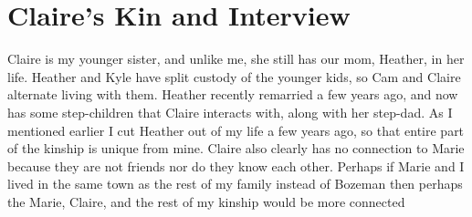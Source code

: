 \documentclass[12pt,a4paper]{article}
\begin{document}
\section*{Claire's Kin and Interview}
Claire is my younger sister, and unlike me, she still has our mom, Heather, in her life. Heather and Kyle have split custody of the younger kids, so Cam and Claire alternate living with them. Heather recently remarried a few years ago, and now has some step-children that Claire interacts with, along with her step-dad. As I mentioned earlier I cut Heather out of my life a few years ago, so that entire part of the kinship is unique from mine. Claire also clearly has no connection to Marie because they are not friends nor do they know each other. Perhaps if Marie and I lived in the same town as the rest of my family instead of Bozeman then perhaps the Marie, Claire, and the rest of my kinship would be more connected
\end{document}
